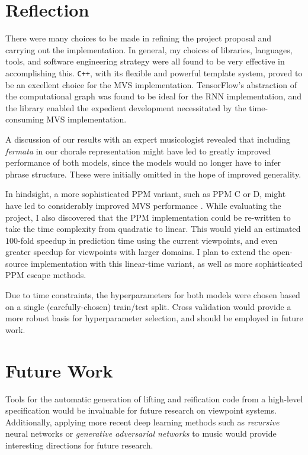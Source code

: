 \documentclass[12pt,a4paper,twoside,openright]{report}
\begin{document}
\section{Reflection}

There were many choices to be made in refining the project proposal and carrying
out the implementation. In general, my choices of libraries, languages, tools,
and software engineering strategy were all found to be very effective in
accomplishing this. \texttt{C++}, with its flexible and powerful template
system, proved to be an excellent choice for the MVS implementation.
TensorFlow's abstraction of the computational graph was found to be ideal for
the RNN implementation, and the library enabled the expedient development
necessitated by the time-consuming MVS implementation.

A discussion of our results with an expert musicologist revealed that including
\emph{fermata} in our chorale representation might have led to greatly
improved performance of both models, since the models would no longer have to
infer phrase structure. These were initially omitted in the hope of improved
generality.

In hindsight, a more sophisticated PPM variant, such as PPM C or D, might have
led to considerably improved MVS performance \cite{pearce2004combining}. While
evaluating the project, I also discovered that the PPM implementation could be
re-written to take the time complexity from quadratic to linear.  This would
yield an estimated $100$-fold speedup in prediction time using the current
viewpoints, and even greater speedup for viewpoints with larger domains. I plan
to extend the open-source implementation with this linear-time variant, as well
as more sophisticated PPM escape methods.

Due to time constraints, the hyperparameters for both models were chosen based
on a single (carefully-chosen) train/test split.  Cross validation would provide
a more robust basis for hyperparameter selection, and should be employed in
future work.

\section{Future Work}

Tools for the automatic generation of lifting and reification code from a
high-level specification would be invaluable for future research on viewpoint
systems. Additionally, applying more recent deep learning methods such as
\emph{recursive} neural networks or \emph{generative adversarial networks} to
music would provide interesting directions for future research.
\end{document}
